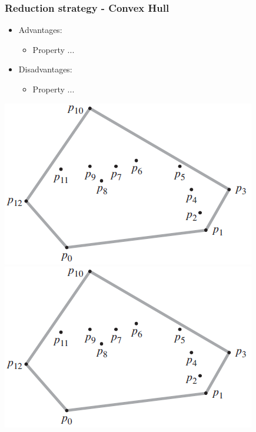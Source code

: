 \begin{frame}
\frametitle{Reduction strategy - Convex Hull}
\begin{multicols}{2}
	\begin{itemize}
		\item Advantages:
		\begin{itemize}
			\item Property ...
		\end{itemize}
		\item Disadvantages:
		\begin{itemize}
			\item Property ...
		\end{itemize}
	\end{itemize}
\columnbreak
	\begin{center}
		\includegraphics[scale=0.5]{graphics/convexHull-example}\\
		\includegraphics[scale=0.5]{graphics/convexHull-example}
	\end{center}
\end{multicols}
\end{frame}